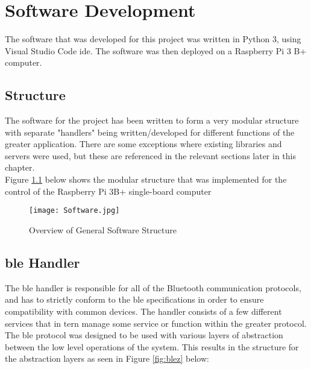 
\chapter{Software Development}
The software that was developed for this project was written in Python 3, using Visual Studio Code \ac{ide}. The software was then deployed on a Raspberry Pi 3 B+ computer. 

\newpage

\section{Structure}

The software for the project has been written to form a very modular structure with separate "handlers" being written/developed for different functions of the greater application. There are some exceptions where existing libraries and servers were used, but these are referenced in the relevant sections later in this chapter.\\
Figure \ref{fig:soft} below shows the modular structure that was implemented for the control of the Raspberry Pi 3B+ single-board computer

\begin{figure}[H]
	\begin{center}
		\texttt{[image: Software.jpg]}
		\caption{Overview of General Software Structure}
		\label{fig:soft}
	\end{center}
\end{figure}

\section{\ac{ble} Handler}
The \ac{ble} handler is responsible for all of the Bluetooth communication protocols, and has to strictly conform to the \ac{ble} specifications in order to ensure compatibility with common devices. The handler consists of a few different services that in tern manage some service or function within the greater protocol.\\
The \ac{ble} protocol was designed to be used with various layers of abstraction between the low level operations of the system. This results in the structure for the abstraction layers as seen in Figure \ref{fig:blez} below:

